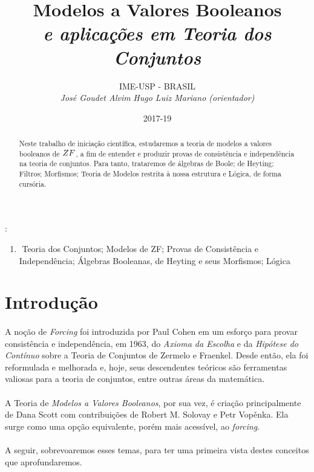\documentclass[12pt]{article}
\title{{\bf Modelos a Valores Booleanos}\\\em e aplicações em Teoria dos Conjuntos}
\author{\large IME-USP - BRASIL\\\small {\em José Goudet Alvim}
    {\em Hugo Luiz Mariano (orientador)} }
\date{2017-19}
\newenvironment{keywords}{{\em Palavras-chave}: \begin{enumerate}[label=]\item$ $\small}{\end{enumerate}}
\begin{document}
        \maketitle
        \begin{keywords}
            Teoria dos Conjuntos; 
            Modelos de {\sc ZF}; 
            Provas de Consistência e Independência; 
            Álgebras Booleanas, de Heyting e seus Morfismos; 
            Lógica
        \end{keywords}
        
        \begin{abstract}
                Neste trabalho de iniciação científica, estudaremos 
                a teoria de modelos a valores booleanos de $\sc ZF$, 
                a fim de entender e produzir provas de consistência 
                e independência na teoria de conjuntos. Para tanto, 
                trataremos de álgebras de Boole; de Heyting; Filtros; 
                Morfismos; Teoria de Modelos restrita à nossa estrutura 
                e Lógica, de forma cursória.
        \end{abstract}
    
        \clearpage
        
        \section{Introdução}
        \paragraph{}
            A noção de {\em Forcing} foi introduzida por Paul Cohen em um esforço para
            provar consistência e independência, em 1963, do {\em Axioma da Escolha} e 
            da {\em Hipótese do Contínuo} sobre a Teoria de Conjuntos de Zermelo e 
            Fraenkel. 
            Desde então, ela foi reformulada e melhorada e, hoje, seus descendentes 
            teóricos são ferramentas valiosas para a teoria de conjuntos, entre outras
            áreas da matemática.
        \paragraph{}
            A Teoria de {\em Modelos a Valores Booleanos}, por sua vez, é criação 
            principalmente de Dana Scott com contribuições de Robert M. Solovay e 
            Petr Vop\v enka. Ela surge como uma opção equivalente, porém mais 
            acessível, ao {\em forcing}.
        \paragraph{}
            A seguir, sobrevoaremos esses temas, para ter uma primeira vista destes conceitos
            que aprofundaremos.
\end{document}

